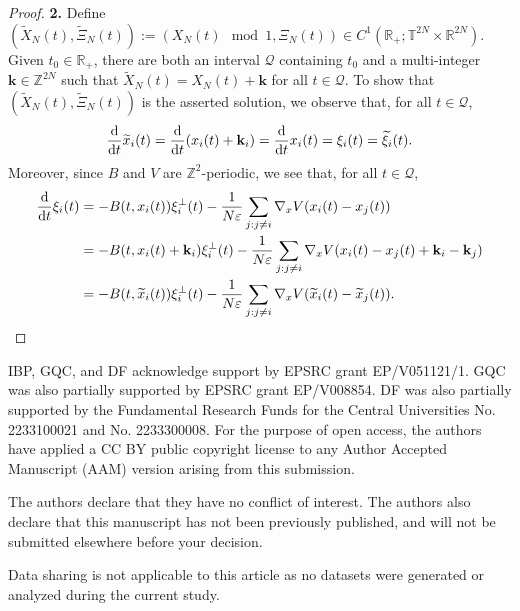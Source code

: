 \documentclass[11pt,reqno]{amsart}
\numberwithin{equation}{section}
\def\dd{{\rm d}}
\begin{document}
\begin{proof}
\smallskip
\textbf{2.} Define  
$(\widetilde{X}_{N}(t),\widetilde{\Xi}_{N}(t))
:=  (X_{N}(t) \mod 1,\Xi_{N}(t))\in C^{1}(\mathbb{R}_{+};\mathbb{T}^{2N}\times \mathbb{R}^{2N})$.  
Given $t_{0}\in \mathbb{R}_{+}$, 
there are both an interval $\mathcal{Q}$ containing $t_{0}$ 
and a multi-integer $\mathbf{k}\in \mathbb{Z}^{2N}$ 
such that $\widetilde{X}_{N}(t)=X_{N}(t)+\mathbf{k}$ for all $t\in \mathcal{Q}$. 
To show that $(\widetilde{X}_{N}(t),\widetilde{\Xi}_{N}(t))$ is the asserted 
solution, we observe that, for all $t\in \mathcal{Q}$,
\begin{align*}
\frac{\dd}{\dd t}\widetilde{x}_{i}(t)=\frac{\dd}{\dd t}(x_{i}(t)+\mathbf{k}_{i})=\frac{\dd}{\dd t}x_{i}(t)=\xi_{i}(t)=\widetilde{\xi}_{i}(t).    
\end{align*}
Moreover, since $B$ and $V$ are $\mathbb{Z}^{2}$-periodic, we see that, for all $t\in \mathcal{Q}$,
\begin{align*}
\frac{\dd}{\dd t}\xi_{i}(t)&=-B(t,x_{i}(t))\xi_{i}^{\perp}(t)-\frac{1}{N\varepsilon}\sum_{j:j\neq i}\nabla_{x}V(x_{i}(t)-x_{j}(t))\\
&=-B(t,x_{i}(t)+\mathbf{k}_{i})\xi_{i}^{\perp}(t)-\frac{1}{N\varepsilon}\sum_{j:j\neq i}\nabla_{x}V(x_{i}(t)-x_{j}(t)+\mathbf{k}_{i}-\mathbf{k}_{j})\\
&=-B(t,\widetilde{x}_{i}(t))\xi_{i}^{\perp}(t)-\frac{1}{N\varepsilon}\sum_{j:j\neq i} \nabla_{x}V(\widetilde{x}_{i}(t)-\widetilde{x}_{j}(t)). 
\end{align*}
\end{proof}


\bigskip
{}
IBP, GQC, and DF acknowledge support by EPSRC grant EP/V051121/1. GQC was also partially supported by EPSRC grant
EP/V008854. DF was also partially supported by the Fundamental Research Funds for the Central Universities No. 2233100021 and No. 2233300008. For the purpose of open access, the authors have applied a CC BY public copyright license to any Author Accepted Manuscript (AAM) version
arising from this submission.

\medskip
{} The authors declare that they have no conflict of interest.
The authors also declare that this manuscript has not been previously published,
and will not be submitted elsewhere before your decision.

\bigskip
{} Data sharing is not applicable to this article as no datasets were generated or analyzed during the current study.
\end{document}
